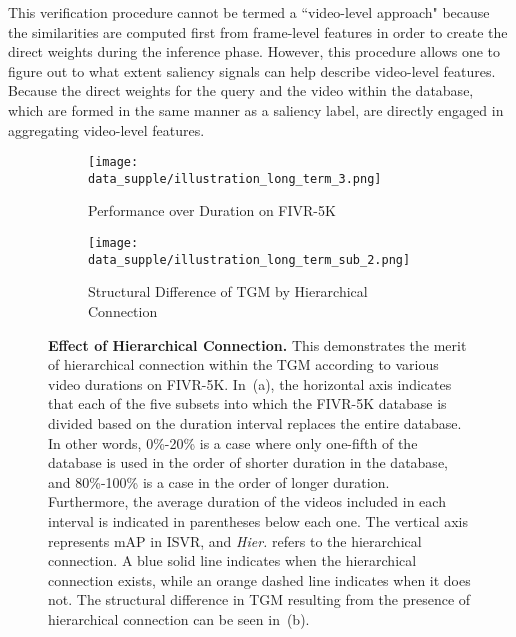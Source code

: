 \documentclass[10pt,twocolumn,letterpaper]{article}
\begin{document}
        This verification procedure cannot be termed a ``video-level approach" because the similarities are computed first from frame-level features in order to create the direct weights during the inference phase. However, this procedure allows one to figure out to what extent saliency signals can help describe video-level features. Because the direct weights for the query and the video within the database, which are formed in the same manner as a saliency label, are directly engaged in aggregating video-level features.
        
    \begin{figure}[t]
        \begin{subfigure}{\linewidth}
            \centering
            \texttt{[image: data\_supple/illustration\_long\_term\_3.png]}
            \vspace{-6mm}
            \caption{Performance over Duration on FIVR-5K}
            \label{fig:hc_sub1}
        \end{subfigure}
        \begin{subfigure}{\linewidth}
        \vspace{6mm}
            \centering
            \texttt{[image: data\_supple/illustration\_long\_term\_sub\_2.png]}
            \vspace{-6mm}
            \caption{Structural Difference of TGM by Hierarchical Connection}
            \label{fig:hc_sub2}
        \end{subfigure}
        \caption{\textbf{Effect of Hierarchical Connection.} This demonstrates the merit of hierarchical connection within the TGM according to various video durations on FIVR-5K. In~(a), the horizontal axis indicates that each of the five subsets into which the FIVR-5K database is divided based on the duration interval replaces the entire database. In other words, 0\%-20\% is a case where only one-fifth of the database is used in the order of shorter duration in the database, and 80\%-100\% is a case in the order of longer duration. Furthermore, the average duration of the videos included in each interval is indicated in parentheses below each one. The vertical axis represents mAP in ISVR, and \textit{Hier.} refers to the hierarchical connection. A blue solid line indicates when the hierarchical connection exists, while an orange dashed line indicates when it does not. The structural difference in TGM resulting from the presence of hierarchical connection can be seen in~(b).\vspace{0mm}}
        \label{fig:hc_all}
    \end{figure}
    
\end{document}
